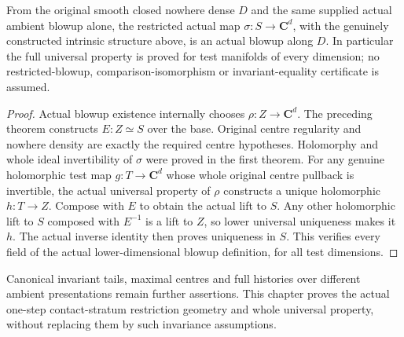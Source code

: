 \begin{theorem}
\label{hir:actual-plane-contact-restricted-blowup}
\leanok
From the original smooth closed nowhere dense $D$ and the same supplied
actual ambient blowup alone, the restricted actual map
$\sigma:S\to\mathbf C^d$, with the genuinely constructed intrinsic
structure above, is an actual blowup along $D$. In particular the full
universal property is proved for test manifolds of every dimension; no
restricted-blowup, comparison-isomorphism or invariant-equality certificate
is assumed.
\end{theorem}
\begin{proof}
Actual blowup existence internally chooses $\rho:Z\to\mathbf C^d$.
The preceding theorem constructs $E:Z\simeq S$ over the base.
Original centre regularity and nowhere density are exactly the required
centre hypotheses. Holomorphy and whole ideal invertibility of $\sigma$
were proved in the first theorem. For any genuine holomorphic test map
$g:T\to\mathbf C^d$ whose whole original centre pullback is invertible,
the actual universal property of $\rho$ constructs a unique holomorphic
$h:T\to Z$. Compose with $E$ to obtain the actual lift to $S$.
Any other holomorphic lift to $S$ composed with $E^{-1}$ is a lift to $Z$,
so lower universal uniqueness makes it $h$. The actual inverse identity
then proves uniqueness in $S$. This verifies every field of the actual
lower-dimensional blowup definition, for all test dimensions.
\end{proof}

Canonical invariant tails, maximal centres and full histories over different
ambient presentations remain further assertions. This chapter proves the
actual one-step contact-stratum restriction geometry and whole universal
property, without replacing them by such invariance assumptions.
